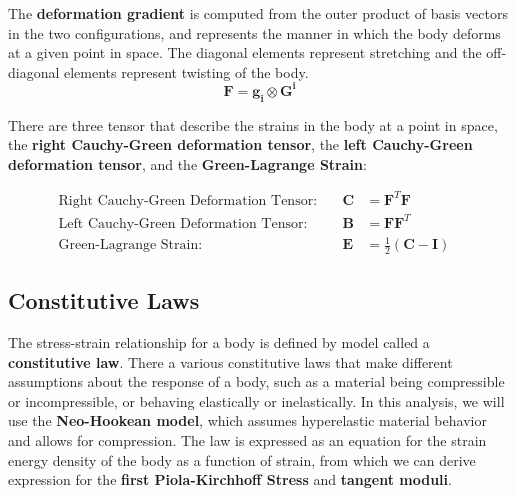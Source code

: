 \documentclass[]{spie}  %
\begin{document}
The \textbf{deformation gradient} is computed from the outer product of basis vectors in the two configurations, and represents the manner in which the body deforms at a given point in space. The diagonal elements represent stretching and the off-diagonal elements represent twisting of the body. 
\begin{equation}
\label{eq: deformation gradient}
\bm{F} = \bm{g_i} \otimes \bm{G^i}
\end{equation}

There are three tensor that describe the strains in the body at a point in space, the \textbf{right Cauchy-Green deformation tensor}, the \textbf{left Cauchy-Green deformation tensor}, and the \textbf{Green-Lagrange Strain}:

\begin{align}
\textrm{Right Cauchy-Green Deformation Tensor:} & \ & \bm{C} 	&= \bm{F}^T\bm{F} & \\
\textrm{Left Cauchy-Green Deformation Tensor:}	& \ & \bm{B}	&= \bm{F}\bm{F}^T & \\
\textrm{Green-Lagrange Strain:}					& \ & \bm{E} 	&= \frac{1}{2}(\bm{C} - \bm{I}) &
\end{align}

\subsection{Constitutive Laws}
\label{subsec: constitutive laws}
The stress-strain relationship for a body is defined by model called a \textbf{constitutive law}. There a various constitutive laws that make different assumptions about the response of a body, such as a material being compressible or incompressible, or behaving elastically or inelastically. In this analysis, we will use the \textbf{Neo-Hookean model}, which assumes hyperelastic material behavior and allows for compression. The law is expressed as an equation for the strain energy density of the body as a function of strain, from which we can derive expression for the \textbf{first Piola-Kirchhoff Stress} and \textbf{tangent moduli}. 
\end{document}
